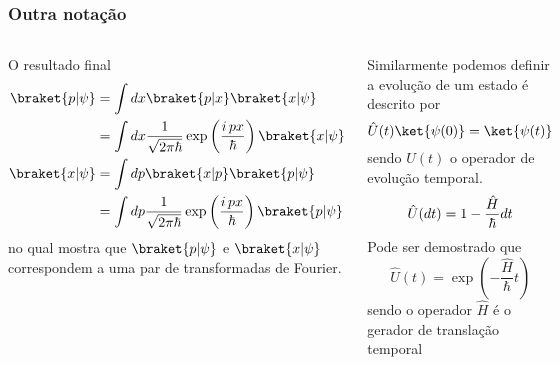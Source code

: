 \documentclass[12pt,brazil,table]{beamer}
\begin{document}
\begin{frame}
  \frametitle{Outra notação}
  \fontsize{7pt}{11pt}\selectfont
  
  \begin{columns}[T]
  

  O resultado final\vspace*{-0.25cm}
  \[
    \begin{align*}
      \braket{p|\psi} &= \int dx \braket{p|x}\braket{x|\psi}\\
      &= \int dx \dfrac{1}{\sqrt{2\pi\hbar}}\exp\left(\dfrac{i\,p x}{\hbar}\right)\braket{x|\psi}\\
      \braket{x|\psi} &= \int dp \braket{x|p}\braket{p|\psi}\\
      &= \int dp \dfrac{1}{\sqrt{2\pi\hbar}}\exp\left(\dfrac{i\,p x}{\hbar}\right)\braket{p|\psi}
    \end{align*}    
  \]
  no qual mostra que $\braket{p|\psi}$ e $\braket{x|\psi}$ correspondem a uma par de transformadas de Fourier.
  

  Similarmente podemos definir a evolução de um estado é descrito por\vspace*{-0.3cm}
  \[
   \hat{U}(t)\ket{\psi(0)} = \ket{\psi(t)}\vspace*{-0.3cm}
  \]
  sendo $\hat{U}(t)$ o operador de evolução temporal.\vspace*{-0.3cm}
  \[
   \hat{U}(dt) = 1 - \dfrac{\hat{H}}{\hbar}dt\vspace*{-0.25cm}
  \]
  Pode ser demostrado que\vspace*{-0.25cm}
  \[
    \hat{U}(t) = \exp\left( -\dfrac{\hat{H}}{\hbar}t \right)
  \]
  sendo o operador $\hat{H}$ é o gerador de translação temporal
  

\end{columns}
\end{frame}
\end{document}
